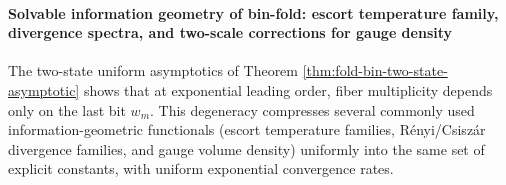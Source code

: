 
\paragraph{Solvable information geometry of bin-fold: escort temperature family, divergence spectra, and two-scale corrections for gauge density}
The two-state uniform asymptotics of Theorem \ref{thm:fold-bin-two-state-asymptotic} shows that at exponential leading order, fiber multiplicity depends only on the last bit \(w_m\).
This degeneracy compresses several commonly used information-geometric functionals (escort temperature families, Rényi/Csiszár divergence families, and gauge volume density) uniformly into the same set of explicit constants, with uniform exponential convergence rates.

